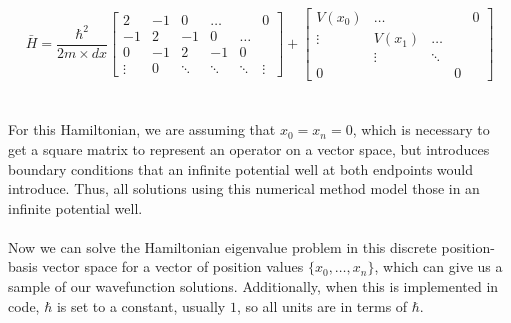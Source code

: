 \documentclass[12pt]{amsart}
\theoremstyle{definition}
\theoremstyle{remark}
\begin{document}
    \[\bar H = 
    \frac{\hbar^2}{2m \times dx}  
    \begin{bmatrix}
        2 & -1 & 0 &  \dots &&0 \\ 
        -1 & 2 & -1 & 0 & \dots \\ 
        0 & -1 & 2 & -1 & 0 &  \\ 
        \vdots & 0 & \ddots & \ddots & \ddots & \vdots      
    \end{bmatrix} + \begin{bmatrix}
        V(x_0) & \dots & & & 0 \\
        \vdots & V(x_1) & \dots& \\
        &\vdots&\ddots &&\\
        0 &&&0 
    \end{bmatrix} \]
\vspace{.25in}\\
\\
For this Hamiltonian, we are assuming that $x_0 = x_n = 0$, which is necessary to get a square matrix to represent an operator on a vector space, 
but introduces boundary conditions that an infinite potential well at both endpoints would introduce. Thus, all solutions using this numerical method 
model those in an infinite potential well.\\
\\
Now we can solve the Hamiltonian eigenvalue problem in this discrete position-basis vector space for a vector of position values $\{x_0,  \dots , x_n\}$, which 
can give us a sample of our wavefunction solutions. Additionally, when this is implemented in code, $\hbar$ is set to a constant, usually $1$, so all units are in 
terms of $\hbar$. \\ 
\\ 
\end{document}
